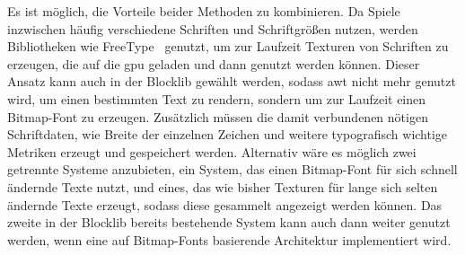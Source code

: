 Es ist möglich, die Vorteile beider Methoden zu kombinieren. Da Spiele inzwischen häufig verschiedene Schriften und Schriftgrößen nutzen, werden Bibliotheken wie FreeType~\cite{TheFreeTypeProject,Vries2020} genutzt, um zur Laufzeit Texturen von Schriften zu erzeugen, die auf die \ac{gpu} geladen und dann genutzt werden können. Dieser Ansatz kann auch in der Blocklib gewählt werden, sodass \ac{awt} nicht mehr genutzt wird, um einen bestimmten Text zu rendern, sondern um zur Laufzeit einen Bitmap-Font zu erzeugen. Zusätzlich müssen die damit verbundenen nötigen Schriftdaten, wie Breite der einzelnen Zeichen und weitere typografisch wichtige Metriken erzeugt und gespeichert werden. Alternativ wäre es möglich zwei getrennte Systeme anzubieten, ein System, das einen Bitmap-Font für sich schnell ändernde Texte nutzt, und eines, das wie bisher Texturen für lange sich selten ändernde Texte erzeugt, sodass diese gesammelt angezeigt werden können. Das zweite in der Blocklib bereits bestehende System kann auch dann weiter genutzt werden, wenn eine auf Bitmap-Fonts basierende Architektur implementiert wird.